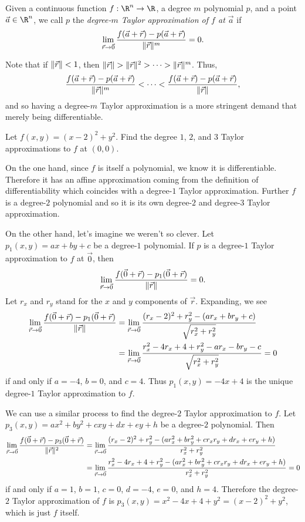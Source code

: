 \begin{definition}
	Given a continuous
	function $f:\R^n\to\R$, a degree $m$ polynomial $p$, and a point 
	$\vec a\in\R^n$, we
	call $p$ the \emph{degree-$m$ Taylor approximation of $f$ at $\vec a$} if
	\[
		\lim_{\vec r\to \vec 0} \frac{f(\vec a+\vec r)-p(\vec a+\vec r)}{\lVert\vec r\rVert^m}=0.
	\]
\end{definition}

Note that if $\lVert\vec r\rVert<1$, then $\lVert\vec r\rVert > \lVert\vec r\rVert^2> \cdots >\lVert\vec r\rVert^m$.
Thus, 
\[
	\frac{f(\vec a+\vec r)-p(\vec a+\vec r)}{\lVert\vec r\rVert^m}<\cdots<
\frac{f(\vec a+\vec r)-p(\vec a+\vec r)}{\lVert\vec r\rVert},
\]
and so having a degree-$m$ Taylor approximation is a more stringent demand that merely being
differentiable.

\begin{example}
	Let $f(x,y)=(x-2)^2+y^2$.  Find the degree $1$, $2$, and $3$ Taylor
	approximations to $f$ at $(0,0)$.

	On the one hand, since $f$ is itself a polynomial, we know it is differentiable.  
	Therefore it has an affine approximation coming from the definition of differentiability
	which coincides with a degree-$1$ Taylor approximation.  Further $f$ is a degree-$2$
	polynomial and so it is its own degree-$2$ and degree-$3$ Taylor approximation.

	On the other hand, let's imagine we weren't so clever.  Let $p_1(x,y)=ax+by+c$
	be a degree-$1$ polynomial.  If $p$ is a degree-$1$ Taylor approximation to $f$
	at $\vec 0$, then
	\[
		\lim_{\vec r\to \vec 0} \frac{f(\vec 0+\vec r)-p_1(\vec 0+\vec r)}{\lVert\vec r\rVert}=0.
	\]
	Let $r_x$ and $r_y$ stand for the $x$ and $y$ components of $\vec r$.
	Expanding, we see
	\begin{align*}
		\lim_{\vec r\to \vec 0} \frac{f(\vec 0+\vec r)-p_1(\vec 0+\vec r)}{\lVert\vec r\rVert}&=
		\lim_{\vec r\to \vec 0} \frac{(r_x-2)^2+r_y^2 -(ar_x+br_y+c)}{\sqrt{r_x^2+r_y^2}}\\
		&=\lim_{\vec r\to \vec 0} \frac{r_x^2-4r_x+4+r_y^2 -ar_x-br_y-c}{\sqrt{r_x^2+r_y^2}}=0
	\end{align*}
	if and only if $a=-4$, $b=0$, and $c=4$.  Thus $p_1(x,y)=-4x+4$ is the unique degree-$1$
	Taylor approximation to $f$.

	We can use a similar process to find the degree-$2$ Taylor approximation to $f$.
	Let $p_3(x,y)=ax^2+by^2+cxy+dx+ey+h$ be a degree-$2$ polynomial.  Then
	\begin{align*}
		\lim_{\vec r\to \vec 0} \frac{f(\vec 0+\vec r)-p_3(\vec 0+\vec r)}{\lVert\vec r\rVert^2}&=
		\lim_{\vec r\to \vec 0} \frac{(r_x-2)^2+r_y^2 -(ar_x^2+br_y^2+cr_xr_y+dr_x+er_y+h)}{r_x^2+r_y^2}\\
		&=\lim_{\vec r\to \vec 0} \frac{r_x^2-4r_x+4+r_y^2 -(ar_x^2+br_y^2+cr_xr_y+dr_x+er_y+h)}{r_x^2+r_y^2}=0
	\end{align*}
	if and only if $a=1$, $b=1$, $c=0$, $d=-4$, $e=0$, and $h=4$.  Therefore
	the degree-$2$ Taylor approximation of $f$ is $p_3(x,y)=x^2-4x+4+y^2=(x-2)^2+y^2$, which
	is just $f$ itself.


\end{example}
